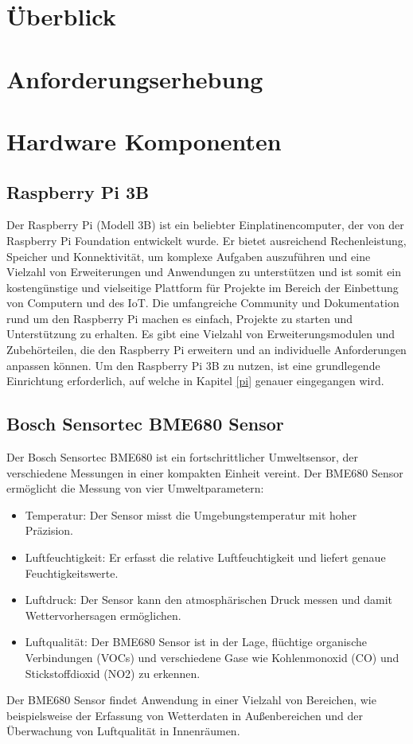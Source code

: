 \documentclass[conference]{IEEEtran}
\begin{document}
\section{Überblick}

\section{Anforderungserhebung}

\section{Hardware Komponenten}
\subsection{Raspberry Pi 3B}
Der Raspberry Pi (Modell 3B) ist ein beliebter Einplatinencomputer, der von der Raspberry Pi Foundation entwickelt wurde. Er bietet ausreichend Rechenleistung, Speicher und Konnektivität, um komplexe Aufgaben auszuführen und eine Vielzahl von Erweiterungen und Anwendungen zu unterstützen und ist somit ein kostengünstige und vielseitige Plattform für Projekte im Bereich der Einbettung von Computern und des IoT. Die umfangreiche Community und Dokumentation rund um den Raspberry Pi machen es einfach, Projekte zu starten und Unterstützung zu erhalten. Es gibt eine Vielzahl von Erweiterungsmodulen und Zubehörteilen, die den Raspberry Pi erweitern und an individuelle Anforderungen anpassen können. Um den Raspberry Pi 3B zu nutzen, ist eine grundlegende Einrichtung erforderlich, auf welche in Kapitel \ref{pi} genauer eingegangen wird. \cite{raspy} 

\subsection{Bosch Sensortec BME680 Sensor}
Der Bosch Sensortec BME680 ist ein fortschrittlicher Umweltsensor, der verschiedene Messungen in einer kompakten Einheit vereint. Der BME680 Sensor ermöglicht die Messung von vier Umweltparametern:
\begin{itemize}
	\item Temperatur: Der Sensor misst die Umgebungstemperatur mit hoher Präzision.
	\item Luftfeuchtigkeit: Er erfasst die relative Luftfeuchtigkeit und liefert genaue Feuchtigkeitswerte.
	\item Luftdruck: Der Sensor kann den atmosphärischen Druck messen und damit Wettervorhersagen ermöglichen.
	\item Luftqualität: Der BME680 Sensor ist in der Lage, flüchtige organische Verbindungen (VOCs) und verschiedene Gase wie Kohlenmonoxid (CO) und Stickstoffdioxid (NO2) zu erkennen.
\end{itemize}
Der BME680 Sensor findet Anwendung in einer Vielzahl von Bereichen, wie beispielsweise der Erfassung von Wetterdaten in Außenbereichen und der Überwachung von Luftqualität in Innenräumen. \cite{bme}
\end{document}
